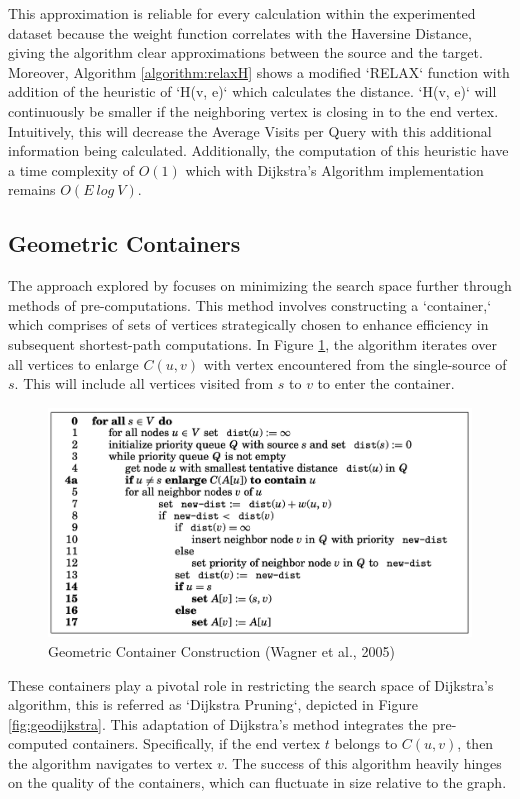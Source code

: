 \documentclass{article}
\begin{document}
This approximation is reliable for every calculation within the experimented dataset because the weight function correlates with the Haversine Distance, giving the algorithm clear approximations between the source and the target. Moreover, Algorithm \ref{algorithm:relaxH} shows a modified `RELAX` function with 
addition of the heuristic of `H(v, e)` which calculates the distance. `H(v, 
e)` will continuously be smaller if the neighboring vertex is closing in to 
the end vertex. Intuitively, this will decrease the Average Visits per Query
with this additional information being calculated. Additionally, the 
computation of this heuristic have a time complexity of \(O(1)\) which with Dijkstra's Algorithm implementation remains $O(E \ log \ V)$.

\subsection{Geometric Containers}

The approach explored by \cite{Wagner2005} focuses on minimizing the search 
space further through methods of pre-computations. This method involves constructing a 
`container,` which comprises of sets of vertices strategically chosen to 
enhance efficiency in subsequent shortest-path computations. In Figure \ref{fig:geoconstruct}, the algorithm iterates over all vertices to enlarge $C(u, v)$ with vertex encountered from the single-source of $s$. This will include all vertices visited from $s$ to $v$ to enter the container.

\begin{figure}[b!]
    \centering
    \includegraphics[width=0.7\linewidth]{img/container.png}
    \caption{Geometric Container Construction (Wagner et al., 2005)}
    \label{fig:geoconstruct}
\end{figure}

These containers play a pivotal role in restricting the search space of Dijkstra's algorithm, this is referred as `Dijkstra Pruning`, depicted in Figure \ref{fig:geodijkstra}. This adaptation of Dijkstra's method integrates the pre-computed containers. Specifically, if the end vertex \(t\) belongs to \(C(u,v)\), then the algorithm navigates to vertex \(v\). The success of this algorithm heavily hinges on the quality of the containers, which can fluctuate in size relative to the graph.
\end{document}
